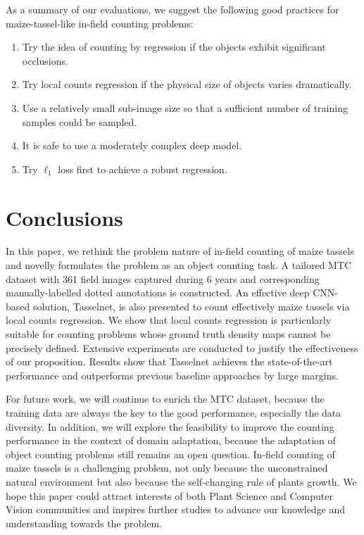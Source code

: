 \documentclass[twocolumn]{bmcart}%
\begin{document}
As a summary of our evaluations, we suggest the following good practices for maize-tassel-like in-field counting problems:
\begin{enumerate}
	\item Try the idea of counting by regression if the objects exhibit significant occlusions.
	\item Try local counts regression if the physical size of objects varies dramatically.
	\item Use a relatively small sub-image size so that a sufficient number of training samples could be sampled.
	\item It is safe to use a moderately complex deep model.
	\item Try $\ell_1$ loss first to achieve a robust regression.
\end{enumerate}

\section*{Conclusions}
In this paper, we rethink the problem nature of in-field counting of maize tassels and novelly formulates the problem as an object counting task. A tailored MTC dataset with 361 field images captured during 6 years and corresponding manually-labelled dotted annotations is constructed. An effective deep CNN-based solution, Tasselnet, is also presented to count effectively maize tassels via local counts regression. We show that local counts regression is particularly suitable for counting problems whose ground truth density maps cannot be precisely defined. Extensive experiments are conducted to justify the effectiveness of our proposition. Results show that Tasselnet achieves the state-of-the-art performance and outperforms previous baseline approaches by large margins.

For future work, we will continue to enrich the MTC dataset, because the training data are always the key to the good performance, especially the data diversity. In addition, we will explore the feasibility to improve the counting performance in the context of domain adaptation, because the adaptation of object counting problems still remains an open question. In-field counting of maize tassels is a challenging problem, not only because the unconstrained natural environment but also because the self-changing rule of plants growth. We hope this paper could attract interests of both Plant Science and Computer Vision communities and inspires further studies to advance our knowledge and understanding towards the problem.
\end{document}
